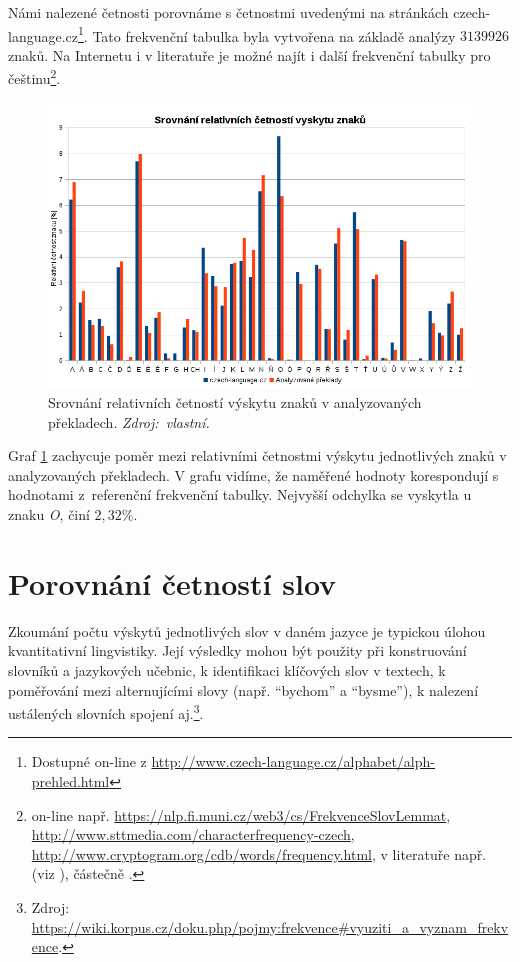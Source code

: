 \documentclass[dp.tex]{subfiles}
\begin{document}
Námi nalezené četnosti porovnáme s četnostmi uvedenými na stránkách czech-language.cz\footnote{Dostupné on-line z \url{http://www.czech-language.cz/alphabet/alph-prehled.html}}. Tato frekvenční tabulka byla vytvořena na základě analýzy $3 139 926$ znaků. Na Internetu i v literatuře je možné najít i další frekvenční tabulky pro češtinu\footnote{on-line např. \url{https://nlp.fi.muni.cz/web3/cs/FrekvenceSlovLemmat}, \url{http://www.sttmedia.com/characterfrequency-czech}, \url{http://www.cryptogram.org/cdb/words/frequency.html}, v literatuře např.  (viz \cite{Kraus1965}), částečně  \cite[str.~109-121]{Tesitelova1987}.}.

\begin{figure}[h!]
	\centering
	\includegraphics[max width=\textwidth,keepaspectratio=true]{imgs-70-prakticka/cetnost-znaku2}
	\caption[Srovnání relativních četností výskytu znaků v analyzovaných překladech.]{Srovnání relativních četností výskytu znaků v analyzovaných překladech. \textit{Zdroj:~vlastní.}}
	\label{fig:character-freq}
\end{figure}

Graf \ref{fig:character-freq} zachycuje poměr mezi relativními četnostmi výskytu jednotlivých znaků v analyzovaných překladech. V grafu vidíme, že naměřené hodnoty korespondují s hodnotami z~referenční frekvenční tabulky. Nejvyšší odchylka se vyskytla u znaku \textit{O}, činí $2{,}32 \%$.

\section{Porovnání četností slov}

Zkoumání počtu výskytů jednotlivých slov v daném jazyce je typickou úlohou kvantitativní lingvistiky. Její výsledky mohou být použity při konstruování slovníků a jazykových učebnic, k identifikaci klíčových slov v textech, k poměřování mezi alternujícími slovy (např. \enquote{bychom} a \enquote{bysme}), k nalezení ustálených slovních spojení aj.\footnote{Zdroj: \url{https://wiki.korpus.cz/doku.php/pojmy:frekvence\#vyuziti_a_vyznam_frekvence}.}.
\end{document}
